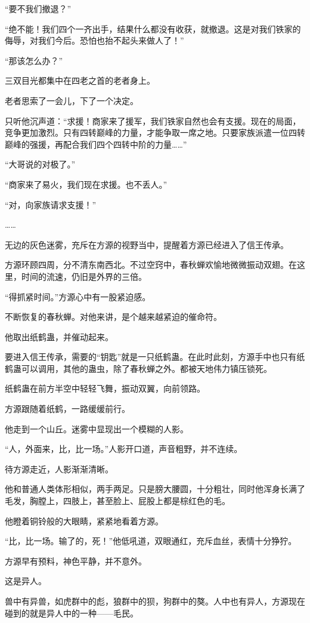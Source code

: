 \begin{this_body}
“要不我们撤退？”

“绝不能！我们四个一齐出手，结果什么都没有收获，就撤退。这是对我们铁家的侮辱，对我们今后。恐怕也抬不起头来做人了！”

“那该怎么办？”

三双目光都集中在四老之首的老者身上。

老者思索了一会儿，下了一个决定。

只听他沉声道：“求援！商家来了援军，我们铁家自然也会有支援。现在的局面，竞争更加激烈。只有四转巅峰的力量，才能争取一席之地。只要家族派遣一位四转巅峰的强援，再配合我们四个四转中阶的力量……”

“大哥说的对极了。”

“商家来了易火，我们现在求援。也不丢人。”

“对，向家族请求支援！”

……

无边的灰色迷雾，充斥在方源的视野当中，提醒着方源已经进入了信王传承。

方源环顾四周，分不清东南西北。不过空窍中，春秋蝉欢愉地微微振动双翅。在这里，时间的流速，仍旧是外界的三倍。

“得抓紧时间。”方源心中有一股紧迫感。

不断恢复的春秋蝉。对他来讲，是个越来越紧迫的催命符。

他取出纸鹤蛊，并催动起来。

要进入信王传承，需要的“钥匙”就是一只纸鹤蛊。在此时此刻，方源手中也只有纸鹤蛊可以调用，其他的蛊虫，除了春秋蝉之外。都被天地伟力镇压锁死。

纸鹤蛊在前方半空中轻轻飞舞，振动双翼，向前领路。

方源跟随着纸鹤，一路缓缓前行。

他走到一个山丘。迷雾中显现出一个模糊的人影。

“人，外面来，比，比一场。”人影开口道，声音粗野，并不连续。

待方源走近，人影渐渐清晰。

他和普通人类体形相似，两手两足。只是膀大腰圆，十分粗壮，同时他浑身长满了毛发，胸膛上，四肢上，甚至脸上、屁股上都是棕红色的毛。

他瞪着铜铃般的大眼睛，紧紧地看着方源。

“比，比一场。输了的，死！”他低吼道，双眼通红，充斥血丝，表情十分狰狞。

方源早有预料，神色平静，并不意外。

这是异人。

兽中有异兽，如虎群中的彪，狼群中的狈，狗群中的獒。人中也有异人，方源现在碰到的就是异人中的一种——毛民。


\end{this_body}
